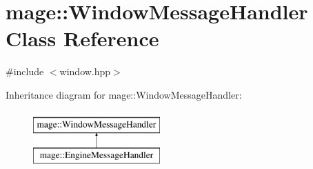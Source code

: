 \hypertarget{classmage_1_1_window_message_handler}{}\section{mage\+:\+:Window\+Message\+Handler Class Reference}
\label{classmage_1_1_window_message_handler}


{\ttfamily \#include $<$window.\+hpp$>$}

Inheritance diagram for mage\+:\+:Window\+Message\+Handler\+:\begin{figure}[H]
\begin{center}
\leavevmode
\includegraphics[height=2.000000cm]{classmage_1_1_window_message_handler}
\end{center}
\end{figure}
